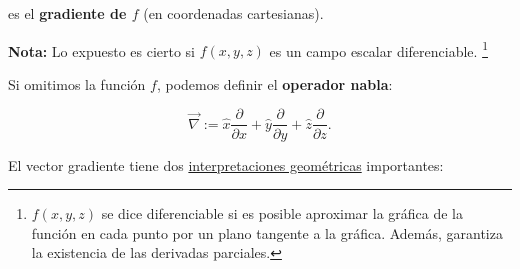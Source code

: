 es el \textbf{gradiente de $f$} (en coordenadas cartesianas).

\textbf{Nota:} Lo expuesto es cierto si $f(x,y,z)$ es un campo escalar diferenciable. \footnote{$f(x,y,z)$ se dice diferenciable si es posible aproximar la gráfica de la función en cada punto por un plano tangente a la gráfica. Además,  garantiza la existencia de las derivadas parciales.}

Si omitimos la función $f$, podemos definir el \textbf{operador nabla}:
\begin{shaded}
$$\vec{\nabla} :=  \hat{x} \frac{\partial}{\partial x} +  \hat{y} \frac{\partial}{\partial y} +   \hat{z} \frac{\partial}{\partial z}.$$
\end{shaded}

El vector gradiente tiene dos \underline{interpretaciones geométricas} importantes:


